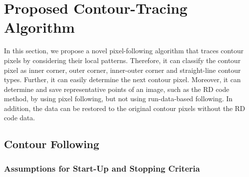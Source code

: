\documentclass[sensors,article,accept,moreauthors,pdftex,10pt,a4paper]{mdpi}
\begin{document}




\section{Proposed Contour-Tracing Algorithm}


In this section, we propose a novel pixel-following algorithm that traces contour pixels by considering their local patterns. Therefore, it can classify the contour pixel as inner corner, outer corner, inner-outer corner and straight-line contour types. Further, it can easily determine the next contour pixel. Moreover, it can determine and save representative points of an image, such as the RD code method, by using pixel following, but not using run-data-based following. In addition, the data can be restored to the original contour pixels without the RD code data.



\newpage
\subsection{Contour Following}
\unskip
\subsubsection{Assumptions for Start-Up and Stopping Criteria}

\end{document}
